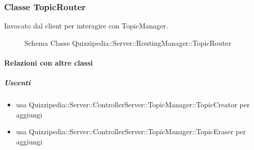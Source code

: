 \subsubsection{Classe TopicRouter}
Invocato dal client per interagire con TopicManager.
\begin{figure}[H]
\centering
\noindent{}
\caption[Schema Classe TopicRouter]{Schema Classe Quizzipedia::Server::RoutingManager::TopicRouter}
\end{figure}
\paragraph{Relazioni con altre classi}
\subparagraph{Uscenti}
\begin{itemize}
\item usa Quizzipedia::Server::ControllerServer::TopicManager::TopicCreator per aggiungi
\item usa Quizzipedia::Server::ControllerServer::TopicManager::TopicEraser per aggiungi
\end{itemize}
